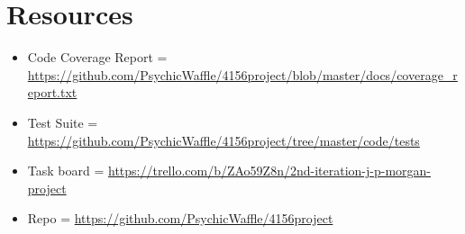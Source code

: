 \documentclass{article}
\begin{document}
\section{Resources}
\begin{itemize}
\item Code Coverage Report = \url{https://github.com/PsychicWaffle/4156project/blob/master/docs/coverage_report.txt}
\item Test Suite = \url{https://github.com/PsychicWaffle/4156project/tree/master/code/tests}
\item Task board = \url{https://trello.com/b/ZAo59Z8n/2nd-iteration-j-p-morgan-project}
\item Repo = \url{https://github.com/PsychicWaffle/4156project}
\end{itemize}
\end{document}
